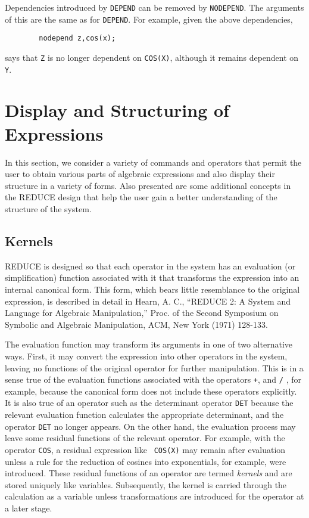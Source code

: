 \documentclass[11pt,letterpaper]{book}
\makeatletter
\newcommand{\REDUCE}{REDUCE}
\newcommand{\underscore}{\_}
\newcommand{\ttindex}[1]{{\renewcommand{\_}{\protect\underscore}%
                          \index{#1@{\tt #1}}}}
\makeatother
\begin{document}
Dependencies introduced by {\tt DEPEND} can be removed by {\tt NODEPEND}.
\ttindex{NODEPEND} The arguments of this are the same as for {\tt DEPEND}.
For example, given the above dependencies,
{\small\begin{verbatim}
        nodepend z,cos(x);
\end{verbatim}}
says that {\tt Z} is no longer dependent on {\tt COS(X)}, although it remains
dependent on {\tt Y}.

\chapter{Display and Structuring of Expressions}
In this section, we consider a variety of commands and operators that
permit the user to obtain various parts of algebraic expressions and also
display their structure in a variety of forms. Also presented are some
additional concepts in the {\REDUCE} design that help the user gain a better
understanding of the structure of the system.

\section{Kernels}
{\REDUCE} is designed so that each operator in the system has an
evaluation (or simplification) function associated
with it that transforms the expression into an internal canonical form.
  This form, which bears little resemblance to the
original expression, is described in detail in Hearn, A. C., ``{\REDUCE} 2:
A System and Language for Algebraic Manipulation,'' Proc. of the Second
Symposium on Symbolic and Algebraic Manipulation, ACM, New York (1971)
128-133.

The evaluation function may transform its arguments in one of two
alternative ways.  First, it may convert the expression into other
operators in the system, leaving no functions of the original operator for
further manipulation.  This is in a sense true of the evaluation functions
associated with the operators {\tt +}, {\tt *} and {\tt /} , for example,
because the canonical form does not include these
operators explicitly.  It is also true of an operator such as the
determinant operator {\tt DET}\ttindex{DET} because the relevant
evaluation function calculates the appropriate determinant, and the
operator {\tt DET} no longer appears.  On the other hand, the evaluation
process may leave some residual functions of the relevant operator.  For
example, with the operator {\tt COS}, a residual expression like {\tt
COS(X)} may remain after evaluation unless a rule for the reduction of
cosines into exponentials, for example, were introduced.  These residual
functions of an operator are termed {\em kernels\/} and are
stored uniquely like variables.  Subsequently, the kernel is carried
through the calculation as a variable unless transformations are
introduced for the operator at a later stage.
\end{document}
